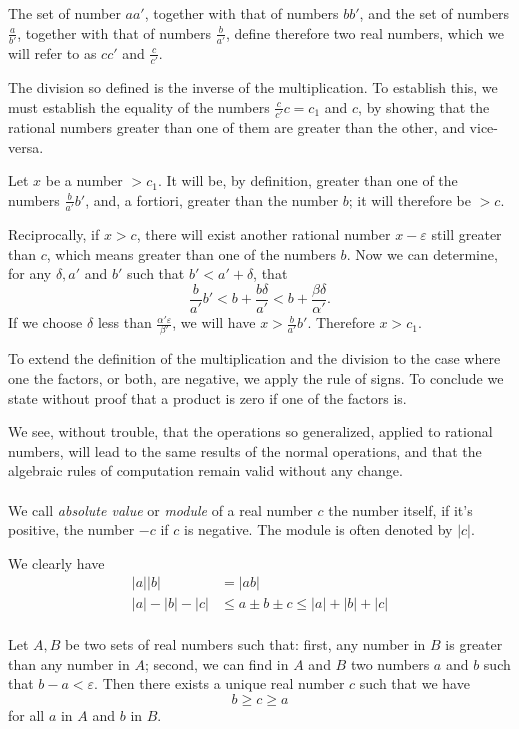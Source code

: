 \documentclass[10pt,letterpaper]{book}
\renewcommand\epsilon{\varepsilon}
\theoremstyle{definition}
\begin{document}
The set of number $aa'$, together with that of numbers $bb'$, and the set of numbers $\frac{a}{b'}$, together with that of numbers $\frac{b}{a'}$, define therefore two real numbers, which we will refer to as $cc'$ and $\frac{c}{c'}$.

The division so defined is the inverse of the multiplication. To establish this, we must establish the equality of the numbers $\frac{c}{c'}c=c_1$ and $c$, by showing that the rational numbers greater than one of them are greater than the other, and vice-versa.

Let $x$ be a number $>c_1$. It will be, by definition, greater than
one of the numbers $\frac{b}{a'}b'$, and, a fortiori, greater than the number $b$; it will therefore be $> c$.

Reciprocally, if $x > c$, there will exist another rational number $x-\epsilon$ still greater than $c$, which means greater than one of the numbers $b$. Now we can determine, for any $\delta, a'$ and $b'$ such that $b'<a'+\delta$, that
\[
  \frac{b}{a'}b'<b+\frac{b\delta}{a'}<b+\frac{\beta\delta}{\alpha'}.
\]
If we choose $\delta$ less than $\frac{\alpha'\epsilon}{\beta'}$, we will have $x>\frac{b}{a'}b'$. Therefore $x > c_1$.

To extend the definition of the multiplication and the division to the case where one the factors, or both, are negative, we apply the rule of signs. To conclude we state without proof that a product is zero if one of the factors is.

We see, without trouble, that the operations so generalized, applied to rational numbers, will lead to the same results of the normal operations, and that the algebraic rules of computation remain valid without any change.

\paragraph{} We call \textit{absolute value} or \textit{module} of a real number $c$ the number itself, if it's positive, the number $-c$ if $c$ is negative. The module is often denoted by $|c|$. 

We clearly have
\begin{align*}
  |a||b| &= |ab| \\
  |a|-|b|-|c| &\leq a \pm b \pm c \leq |a|+|b|+|c|
\end{align*}

\paragraph{} Let $A,B$ be two sets of real numbers such that: first, any number in $B$ is greater than any number in $A$; second, we can find in $A$ and $B$ two numbers $a$ and $b$ such that $b-a<\epsilon$. Then there exists a unique real number $c$ such that we have
\[
  b\geq c \geq a
\]
for all $a$ in $A$ and $b$ in $B$.
\end{document}
